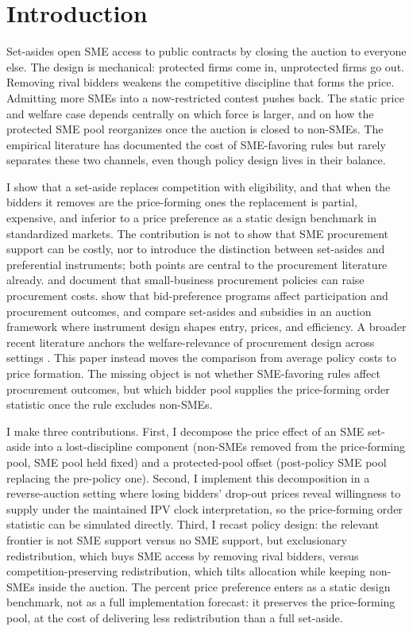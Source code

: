 \section{Introduction}

Set-asides open SME access to public contracts by closing the auction to
everyone else. The design is mechanical: protected firms come in, unprotected
firms go out. Removing rival bidders weakens the competitive discipline that
forms the price. Admitting more SMEs into a now-restricted contest pushes
back. The static price and welfare case depends centrally on which force is
larger, and on how the protected SME pool reorganizes once the auction is
closed to non-SMEs. The empirical literature has documented the cost of
SME-favoring rules but rarely separates these two channels, even though
policy design lives in their balance.

I show that a set-aside replaces competition with eligibility, and that when
the bidders it removes are the price-forming ones the replacement is partial,
expensive, and inferior to a price preference as a static design benchmark in
standardized markets. The contribution is not to show that SME procurement support can be
costly, nor to introduce the distinction between set-asides and
preferential instruments; both points are central to the procurement
literature already. \citet{marion2007} and \citet{nakabayashi2013}
document that small-business procurement policies can raise procurement
costs. \citet{krasnokutskayaseim2011} show that bid-preference programs
affect participation and procurement outcomes, and \citet{athey2013}
compare set-asides and subsidies in an auction framework where instrument
design shapes entry, prices, and efficiency. A broader recent
literature anchors the welfare-relevance of procurement design across
settings \citep{coviello2014,bosio2022,best2023,decarolis2024}. This
paper instead moves the comparison from average policy costs to price
formation. The missing object is not whether SME-favoring rules affect
procurement outcomes, but which bidder pool supplies the price-forming
order statistic once the rule excludes non-SMEs.

I make three contributions. First, I decompose the price effect of an SME
set-aside into a lost-discipline component (non-SMEs removed from the
price-forming pool, SME pool held fixed) and a protected-pool offset
(post-policy SME pool replacing the pre-policy one). Second, I implement
this decomposition in a reverse-auction setting where losing bidders'
drop-out prices reveal willingness to supply under the maintained IPV
clock interpretation, so the price-forming order statistic can be
simulated directly. Third, I recast policy design: the relevant frontier
is not SME support versus no SME support, but exclusionary redistribution,
which buys SME access by removing rival bidders, versus
competition-preserving redistribution, which tilts allocation while
keeping non-SMEs inside the auction. The \prefMainPct{} percent price preference
enters as a static design benchmark, not as a full implementation
forecast: it preserves the price-forming pool, at the cost of delivering
less redistribution than a full set-aside.

